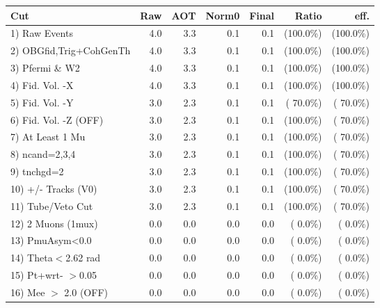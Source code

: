  \begin{table}[h!]\centering
 \begin{tabular}{||l||r|r|r|r|r|r||}
 \hline
 \hline
 Cut & Raw & AOT & Norm0 & Final & Ratio & eff.       \\
 \hline
  1) Raw Events           &          4.0 &          3.3 &          0.1 &          0.1 & (100.0\%) & (100.0\%) \\
  2) OBGfid,Trig+CohGenTh &          4.0 &          3.3 &          0.1 &          0.1 & (100.0\%) & (100.0\%) \\
  3) Pfermi \& W2         &          4.0 &          3.3 &          0.1 &          0.1 & (100.0\%) & (100.0\%) \\
  4) Fid. Vol. -X         &          4.0 &          3.3 &          0.1 &          0.1 & (100.0\%) & (100.0\%) \\
  5) Fid. Vol. -Y         &          3.0 &          2.3 &          0.1 &          0.1 & ( 70.0\%) & ( 70.0\%) \\
  6) Fid. Vol. -Z (OFF)   &          3.0 &          2.3 &          0.1 &          0.1 & (100.0\%) & ( 70.0\%) \\
  7) At Least 1 Mu        &          3.0 &          2.3 &          0.1 &          0.1 & (100.0\%) & ( 70.0\%) \\
  8) ncand=2,3,4          &          3.0 &          2.3 &          0.1 &          0.1 & (100.0\%) & ( 70.0\%) \\
  9) tnchgd=2             &          3.0 &          2.3 &          0.1 &          0.1 & (100.0\%) & ( 70.0\%) \\
 10) +/- Tracks (V0)      &          3.0 &          2.3 &          0.1 &          0.1 & (100.0\%) & ( 70.0\%) \\
 11) Tube/Veto Cut        &          3.0 &          2.3 &          0.1 &          0.1 & (100.0\%) & ( 70.0\%) \\
 12) 2 Muons (1mux)       &          0.0 &          0.0 &          0.0 &          0.0 & (  0.0\%) & (  0.0\%) \\
 13) PmuAsym<0.0          &          0.0 &          0.0 &          0.0 &          0.0 & (  0.0\%) & (  0.0\%) \\
 14) Theta$<$2.62 rad     &          0.0 &          0.0 &          0.0 &          0.0 & (  0.0\%) & (  0.0\%) \\
 15) Pt+wrt- $>$0.05      &          0.0 &          0.0 &          0.0 &          0.0 & (  0.0\%) & (  0.0\%) \\
 16) Mee $>$ 2.0  (OFF)   &          0.0 &          0.0 &          0.0 &          0.0 & (  0.0\%) & (  0.0\%) \\

\end{tabular}
\end{table}
